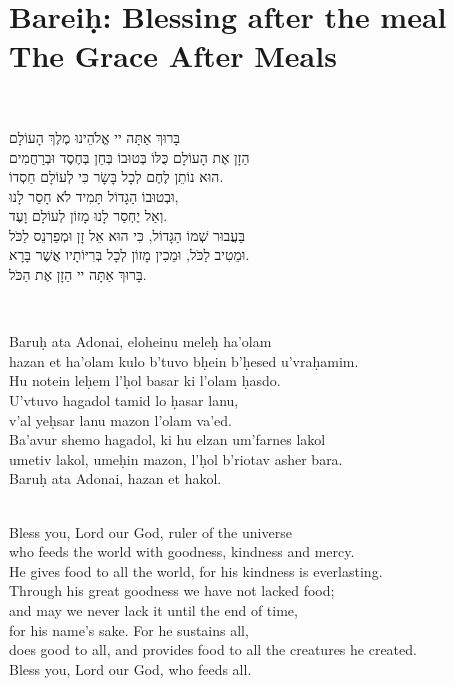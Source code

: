 \documentclass[a4paper,10pt,openany]{memoir}
\newcommand{\HgInst}[1]{{\noindent\sffamily{\bfseries{#1}}}}
\newenvironment{HgEnglish}{\strut\\\noindent}{\vspace{1em}}
\newenvironment{HgTranslit}{\strut\\\noindent\begin{itshape}}{\end{itshape}\vspace{1em}}
\newenvironment{HgHebrew}{\begin{otherlanguage}{hebrew}\strut\\\noindent\Large
}{\par\end{otherlanguage}\vspace{1em}}
\begin{document}
\chapter{Barei\d{h}: Blessing after the meal \\ {\LARGE The Grace After Meals}}

\vfill

\HgInst{Pour the third cup of wine. Read:}

\begin{HgHebrew}
  בָּרוּךְ אַתָּה יי אֱלֹהֵינוּ מֶלֶךְ הָעוֹלָם 
  \\
  הַזָן אֶת הָעוֹלָם כֻּלּוֹ בְּטוּבוֹ בְּחֵן בְּחֶסֶד וּבְרַחֲמִים
  \\
  הוּא נוֹתֵן לֶחֶם לְכָל בָּשָׂר כִּי לְעוֹלָם חַסְדוֹ. 
  \\
  וּבְטוּבוֹ הַגָדוֹל תָּמִיד לֹא חָסַר לָנוּ, 
  \\
  וְאַל יֶחְסַר לָנוּ מָזוֹן לְעוֹלָם וָעֶד. 
  \\
  בַּעֲבוּר שְׁמוֹ הַגָּדוֹל, כִּי הוּא אֵל זָן וּמְפַרְנֵס לַכֹּל 
  \\
  וּמֵטִיב לַכֹּל, וּמֵכִין מָזוֹן לְכָל בְּרִיּוֹתָיו אֲשֶׁר בָּרָא. 
  \\
  בָּרוּךְ אַתָּה יי הַזָן אֶת הַכֹּל.
\end{HgHebrew}

\begin{HgTranslit}
  Baru\d{h} ata Adonai, eloheinu mele\d{h} ha'olam \\
  hazan et ha'olam kulo b'tuvo b\d{h}ein b'\d{h}esed u'vra\d{h}amim. \\
  Hu notein le\d{h}em l'\d{h}ol basar ki l'olam \d{h}asdo. \\
  U'vtuvo hagadol tamid lo \d{h}asar lanu, \\
  v'al ye\d{h}sar lanu mazon l'olam va'ed. \\
  Ba'avur shemo hagadol, ki hu elzan um'farnes lakol \\
  umetiv lakol, ume\d{h}in mazon, l'\d{h}ol b'riotav asher bara. \\
  Baru\d{h} ata Adonai, hazan et hakol.
\end{HgTranslit}
\begin{HgEnglish}
  Bless you, Lord our God, ruler of the universe \\
  who feeds the world with goodness, kindness and mercy. \\
  He gives food to all the world, for his kindness is everlasting. \\
  Through his great goodness we have not lacked food; \\
  and may we never lack it until the end of time, \\
  for his name's sake. For he sustains all, \\
  does good to all, and provides food to all the creatures he created. \\
  Bless you, Lord our God, who feeds all.
\end{HgEnglish}
\end{document}
